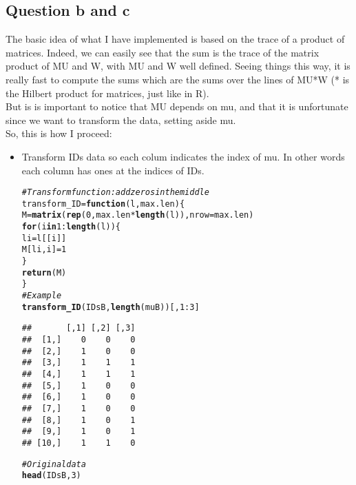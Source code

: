 \documentclass{llncs}\usepackage[]{graphicx}\usepackage[]{color}
\makeatletter
\newcommand{\hlnum}[1]{\textcolor[rgb]{0.686,0.059,0.569}{#1}}%
\newcommand{\hlcom}[1]{\textcolor[rgb]{0.678,0.584,0.686}{\textit{#1}}}%
\newcommand{\hlopt}[1]{\textcolor[rgb]{0,0,0}{#1}}%
\newcommand{\hlstd}[1]{\textcolor[rgb]{0.345,0.345,0.345}{#1}}%
\newcommand{\hlkwa}[1]{\textcolor[rgb]{0.161,0.373,0.58}{\textbf{#1}}}%
\newcommand{\hlkwb}[1]{\textcolor[rgb]{0.69,0.353,0.396}{#1}}%
\newcommand{\hlkwc}[1]{\textcolor[rgb]{0.333,0.667,0.333}{#1}}%
\newcommand{\hlkwd}[1]{\textcolor[rgb]{0.737,0.353,0.396}{\textbf{#1}}}%
\newenvironment{kframe}{%
 \def\at@end@of@kframe{}%
 \ifinner\ifhmode%
  \def\at@end@of@kframe{\end{minipage}}%
  \begin{minipage}{\columnwidth}%
 \fi\fi%
 \def\FrameCommand##1{\hskip\@totalleftmargin \hskip-\fboxsep
 \colorbox{shadecolor}{##1}\hskip-\fboxsep
     \hskip-\linewidth \hskip-\@totalleftmargin \hskip\columnwidth}%
 \MakeFramed {\advance\hsize-\width
   \@totalleftmargin\z@ \linewidth\hsize
   \@setminipage}}%
 {\par\unskip\endMakeFramed%
 \at@end@of@kframe}
\newenvironment{knitrout}{}{} %
\makeatother
\begin{document}
\subsection{Question b and c}
The basic idea of what I have implemented is based on the trace of a product of matrices. Indeed, we can easily see that the sum is the trace of the matrix product of MU and W, with MU and W well defined. Seeing things this way, it is really fast to compute the sums which are the sums over the lines of MU*W (* is the Hilbert product for matrices, just like in R). \\
But is is important to notice that MU depends on mu, and that it is unfortunate since we want to transform the data, setting aside mu. \\
So, this is how I proceed:
\begin {itemize}
\item Transform IDs data so each colum indicates the index of mu. In other words each column has ones at the indices of IDs.
\begin{knitrout}
\color{fgcolor}\begin{kframe}
\begin{alltt}
\hlcom{# Transform function : add zeros in the middle}
\hlstd{transform_ID} \hlkwb{=} \hlkwa{function}\hlstd{(}\hlkwc{l}\hlstd{,}\hlkwc{max.len}\hlstd{)\{}
  \hlstd{M}\hlkwb{=}\hlkwd{matrix}\hlstd{(}\hlkwd{rep}\hlstd{(}\hlnum{0}\hlstd{,max.len}\hlopt{*}\hlkwd{length}\hlstd{(l)),}\hlkwc{nrow}\hlstd{=max.len)}
  \hlkwa{for} \hlstd{(i} \hlkwa{in} \hlnum{1}\hlopt{:}\hlkwd{length}\hlstd{(l))\{}
    \hlstd{li}\hlkwb{=}\hlstd{l[[i]]}
    \hlstd{M[li,i]}\hlkwb{=}\hlnum{1}
  \hlstd{\}}
  \hlkwd{return}\hlstd{(M)}
\hlstd{\}}
\hlcom{# Example}
\hlkwd{transform_ID}\hlstd{(IDsB,}\hlkwd{length}\hlstd{(muB))[,}\hlnum{1}\hlopt{:}\hlnum{3}\hlstd{]}
\end{alltt}
\begin{lstlisting}[basicstyle=\ttfamily,breaklines=true]
##       [,1] [,2] [,3]
##  [1,]    0    0    0
##  [2,]    1    0    0
##  [3,]    1    1    1
##  [4,]    1    1    1
##  [5,]    1    0    0
##  [6,]    1    0    0
##  [7,]    1    0    0
##  [8,]    1    0    1
##  [9,]    1    0    1
## [10,]    1    1    0
\end{lstlisting}
\begin{alltt}
\hlcom{# Original data}
\hlkwd{head}\hlstd{(IDsB,}\hlnum{3}\hlstd{)}
\end{alltt}
\begin{lstlisting}[basicstyle=\ttfamily,breaklines=true]

\end{lstlisting}
\end{kframe}
\end{knitrout}
\end{itemize}
\end{document}

